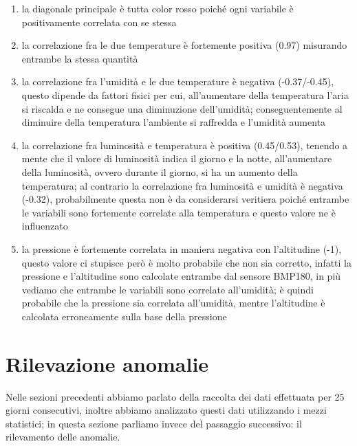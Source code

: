 \documentclass[fleqn, 12pt]{SelfArx}
\begin{document}
\begin{enumerate}
  \item la diagonale principale è tutta color rosso poiché ogni variabile è positivamente correlata con se stessa
  \item la correlazione fra le due temperature è fortemente positiva (0.97) misurando entrambe la stessa quantità
  \item la correlazione fra l'umidità e le due temperature è negativa (-0.37/-0.45), questo dipende da fattori fisici per cui, all'aumentare della temperatura l'aria si riscalda e ne consegue una diminuzione dell'umidità; 
  conseguentemente al diminuire della temperatura l'ambiente si raffredda e l'umidità aumenta
  \item la correlazione fra luminosità e temperatura è positiva (0.45/0.53), tenendo a mente che il valore di luminosità indica il giorno e la notte, all'aumentare della luminosità, ovvero durante il giorno, si ha un aumento
  della temperatura; al contrario la correlazione fra luminosità e umidità è negativa (-0.32), probabilmente questa non è da considerarsi veritiera poiché entrambe le variabili sono fortemente correlate alla temperatura e 
  questo valore ne è influenzato
  \item la pressione è fortemente correlata in maniera negativa con l'altitudine (-1), questo valore ci stupisce però è molto probabile che non sia corretto, infatti la pressione e l'altitudine sono calcolate
  entrambe dal sensore BMP180, in più vediamo che entrambe le variabili sono correlate all'umidità; è quindi probabile che la pressione sia correlata all'umidità, mentre l'altitudine è calcolata erroneamente sulla base 
  della pressione
\end{enumerate}

\section{Rilevazione anomalie}

Nelle sezioni precedenti abbiamo parlato della raccolta dei dati effettuata per 25 giorni consecutivi, inoltre abbiamo analizzato questi dati utilizzando i mezzi statistici; in questa sezione parliamo invece del passaggio 
successivo: il rilevamento delle anomalie. 
\end{document}
